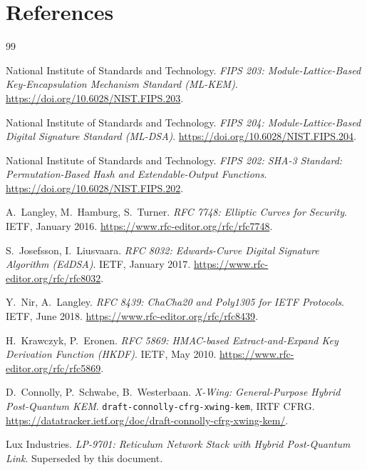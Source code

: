 \documentclass[11pt,a4paper]{article}
\begin{document}
\section{References}

\begin{thebibliography}{99}

 National Institute of Standards and Technology.
\textit{FIPS 203: Module-Lattice-Based Key-Encapsulation Mechanism Standard
(ML-KEM)}.
\url{https://doi.org/10.6028/NIST.FIPS.203}.

 National Institute of Standards and Technology.
\textit{FIPS 204: Module-Lattice-Based Digital Signature Standard
(ML-DSA)}.
\url{https://doi.org/10.6028/NIST.FIPS.204}.

 National Institute of Standards and Technology.
\textit{FIPS 202: SHA-3 Standard: Permutation-Based Hash and
Extendable-Output Functions}.
\url{https://doi.org/10.6028/NIST.FIPS.202}.

 A.\ Langley, M.\ Hamburg, S.\ Turner.
\textit{RFC 7748: Elliptic Curves for Security}. IETF, January 2016.
\url{https://www.rfc-editor.org/rfc/rfc7748}.

 S.\ Josefsson, I.\ Liusvaara.
\textit{RFC 8032: Edwards-Curve Digital Signature Algorithm (EdDSA)}.
IETF, January 2017.
\url{https://www.rfc-editor.org/rfc/rfc8032}.

 Y.\ Nir, A.\ Langley.
\textit{RFC 8439: ChaCha20 and Poly1305 for IETF Protocols}.
IETF, June 2018.
\url{https://www.rfc-editor.org/rfc/rfc8439}.

 H.\ Krawczyk, P.\ Eronen.
\textit{RFC 5869: HMAC-based Extract-and-Expand Key Derivation Function
(HKDF)}. IETF, May 2010.
\url{https://www.rfc-editor.org/rfc/rfc5869}.

 D.\ Connolly, P.\ Schwabe, B.\ Westerbaan.
\textit{X-Wing: General-Purpose Hybrid Post-Quantum KEM}.
\texttt{draft-connolly-cfrg-xwing-kem}, IRTF CFRG.
\url{https://datatracker.ietf.org/doc/draft-connolly-cfrg-xwing-kem/}.

 Lux Industries.
\textit{LP-9701: Reticulum Network Stack with Hybrid Post-Quantum Link}.
Superseded by this document.

\end{thebibliography}
\end{document}
